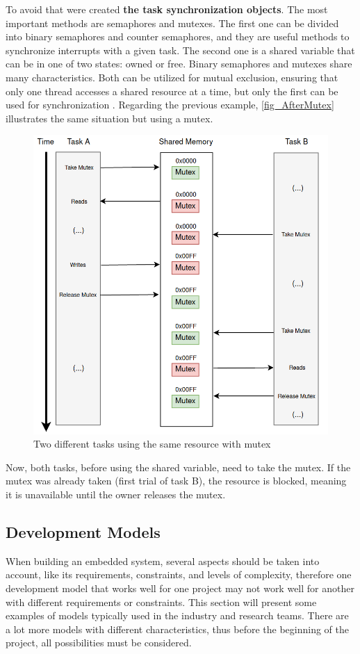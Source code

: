 To avoid that were created \textbf{the task synchronization objects}. The most important methods are semaphores and mutexes. The first one can be divided into binary semaphores and counter semaphores, and they are useful methods to synchronize interrupts with a given task. The second one is a shared variable that can be in one of two states: owned or free. Binary semaphores and mutexes share many characteristics. Both can be utilized for mutual exclusion, ensuring that only one thread accesses a shared resource at a time, but only the first can be used for synchronization \cite{OSbook2}. Regarding the previous example, \autoref{fig_AfterMutex} illustrates the same situation but using a mutex.

\begin{figure}[H]
	\centering
 	\includegraphics[width=0.7\linewidth]{Images/AfterMutex.png}
 	\caption{ Two different tasks using the same resource with mutex }
	 \label{fig_AfterMutex}
\end{figure}

Now, both tasks, before using the shared variable, need to take the mutex. If the mutex was already taken (first trial of task B), the resource is blocked, meaning it is unavailable until the owner releases the mutex. 


\subsection{Development Models}
\label{sub_sec::DevModels}

When building an embedded system, several aspects should be taken into account, like its requirements, constraints, and levels of complexity, therefore one development model that works well for one project may not work well for another with different requirements or constraints. This section will present some examples of models typically used in the industry and research teams. There are a lot more models with different characteristics, thus before the beginning of the project, all possibilities must be considered.
\newline

